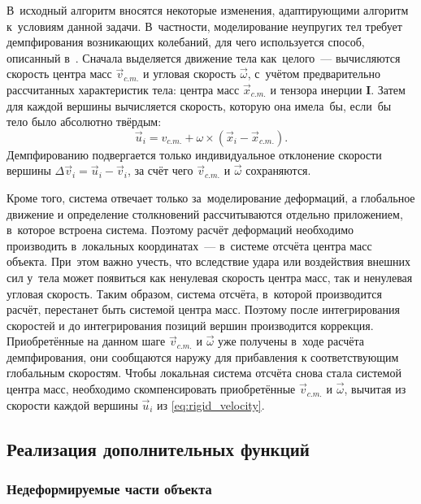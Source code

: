 \documentclass[a4paper, 14pt, titlepage]{extarticle}
\newcommand{\vect}[1]{\vec{#1}}
\newcommand{\matrx}[1]{\mathbf{#1}}
\begin{document}
      В~исходный алгоритм вносятся некоторые изменения, адаптирующими алгоритм к~условиям данной
      задачи. В~частности, моделирование неупругих тел требует демпфирования возникающих колебаний,
      для чего используется способ, описанный в~\cite[с.~5]{mueller-position-dynamics}. Сначала выделяется
      движение тела как~целого~--- вычисляются скорость центра масс $\vect{v}_{c.m.}$ и угловая
      скорость $\vect{\omega}$, с~учётом предварительно рассчитанных характеристик тела: центра масс
      $\vect{x}_{c.m.}$ и тензора инерции $\matrx I$. Затем для каждой вершины вычисляется скорость,
      которую она имела~бы, если~бы тело было абсолютно твёрдым:
      \begin{equation}\label{eq:rigid_velocity}
        \vect{u}_i = v_{c.m.} + \omega \times (\vect{x}_i - \vect{x}_{c.m.}).
      \end{equation}
      Демпфированию подвергается только индивидуальное отклонение скорости вершины
      $\Delta \vect{v}_i = \vect{u}_i - \vect{v}_i$, за счёт чего $\vect{v}_{c.m.}$ и $\vect{\omega}$
      сохраняются.

      Кроме того, система отвечает только за~моделирование деформаций, а глобальное движение и
      определение столкновений рассчитываются отдельно приложением, в~которое встроена система.
      Поэтому расчёт деформаций необходимо производить в~локальных координатах~--- в~системе отсчёта
      центра масс объекта. При~этом важно учесть, что вследствие удара или воздействия внешних сил
      у~тела может появиться как ненулевая скорость центра масс, так и ненулевая угловая скорость.
      Таким образом, система отсчёта, в~которой производится расчёт, перестанет быть системой центра
      масс.  Поэтому после интегрирования скоростей и до интегрирования позиций вершин производится
      коррекция. Приобретённые на данном шаге $\vect{v}_{c.m.}$ и $\vect{\omega}$ уже получены
      в~ходе расчёта демпфирования, они сообщаются наружу для прибавления к соответствующим
      глобальным скоростям. Чтобы локальная система отсчёта снова стала системой центра масс,
      необходимо скомпенсировать приобретённые $\vect{v}_{c.m.}$ и $\vect{\omega}$, вычитая из
      скорости каждой вершины $\vect{u}_i$ из \eqref{eq:rigid_velocity}.

    \subsection{Реализация дополнительных функций}
    \subsubsection{Недеформируемые части объекта}
\end{document}
